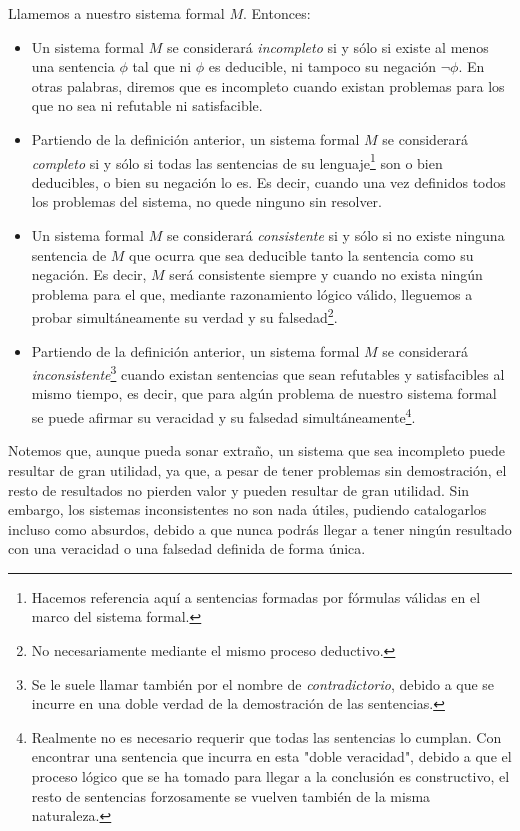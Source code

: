 Llamemos a nuestro sistema formal $M$. Entonces:
\begin{itemize}
    \item Un sistema formal $M$ se considerará \textit{incompleto} si y sólo si existe al menos una sentencia $\phi$ tal que ni $\phi$ es deducible, ni tampoco su negación $\neg \phi$. En otras palabras, diremos que es incompleto cuando 
            existan problemas para los que no sea ni refutable ni satisfacible.
    \item Partiendo de la definición anterior, un sistema formal $M$ se considerará \textit{completo} si y sólo si todas las sentencias de su lenguaje\footnote{Hacemos referencia aquí a sentencias formadas por fórmulas válidas en el marco del sistema formal.}
            son o bien deducibles, o bien su negación lo es. Es decir, cuando una vez definidos todos los problemas del sistema, no quede ninguno sin resolver.
    \item Un sistema formal $M$ se considerará \textit{consistente} si y sólo si no existe ninguna sentencia de $M$ que ocurra que sea deducible tanto la sentencia como su negación. Es decir, $M$ será consistente siempre y cuando no exista ningún problema para el que,
            mediante razonamiento lógico válido, lleguemos a probar simultáneamente su verdad y su falsedad\footnote{No necesariamente mediante el mismo proceso deductivo.}.
    \item Partiendo de la definición anterior, un sistema formal $M$ se considerará \textit{inconsistente}\footnote{Se le suele llamar también por el nombre de \textit{contradictorio}, debido a que se incurre en una doble verdad de la demostración 
            de las sentencias.} cuando existan sentencias que sean refutables y satisfacibles al mismo tiempo, es decir, que para algún problema de nuestro sistema 
            formal se puede afirmar su veracidad y su falsedad simultáneamente\footnote{Realmente no es necesario 
            requerir que todas las sentencias lo cumplan. Con encontrar una sentencia que incurra en esta "doble veracidad", debido a que el proceso lógico que se ha tomado para llegar a la conclusión es constructivo, el resto de sentencias 
            forzosamente se vuelven también de la misma naturaleza.}.
\end{itemize}

Notemos que, aunque pueda sonar extraño, un sistema que sea incompleto puede resultar de gran utilidad, ya que, a pesar de tener problemas sin demostración, el resto de resultados no pierden valor y pueden resultar de gran utilidad.
Sin embargo, los sistemas inconsistentes no son nada útiles, pudiendo catalogarlos incluso como absurdos, debido a que nunca podrás llegar a tener ningún resultado con una veracidad o una falsedad definida de forma única.

